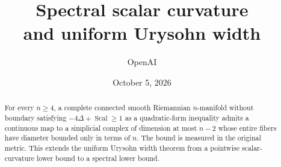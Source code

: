 \documentclass[11pt]{article}
\title{Spectral scalar curvature\protect\\and uniform Urysohn width}
\author{OpenAI}
\date{October 5, 2026}
\theoremstyle{definition}
\theoremstyle{remark}
\DeclareMathOperator{\Scal}{Scal}
\numberwithin{equation}{section}
\begin{document}
\maketitle
\begin{abstract}
For every $n\ge4$, a complete connected smooth Riemannian $n$-manifold
without boundary satisfying $-4\Delta+\Scal\ge1$ as a quadratic-form
inequality admits a continuous map to a simplicial complex of dimension
at most $n-2$ whose entire fibers have diameter bounded only in terms
of $n$. The bound is measured in the original metric. This extends the
uniform Urysohn width theorem from a pointwise scalar-curvature lower
bound to a spectral lower bound.
\end{abstract}
\tableofcontents
\clearpage








\end{document}

